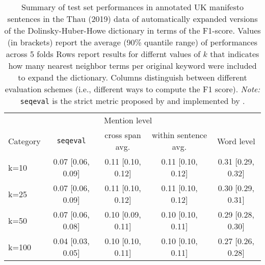 \begin{table}[!t]

\caption{\label{tab:dictionary_expansion_all_f1s_by_k}Summary of test set performances in annotated UK manifesto sentences in the  Thau (2019) data of automatically expanded versions of the Dolinsky-Huber-Howe dictionary in terms of the F1-score. Values (in brackets) report the average (90\% quantile range) of performances across 5 folds Rows report results for differnt values of $k$ that indicates how many nearest neighbor terms per original keyword were included to expand the dictionary. Columns distinguish between different evaluation schemes (i.e., different ways to compute the F1 score). \emph{Note:} \texttt{seqeval} is the strict metric proposed by \citet{ramshaw_text_1995} and implemented by \citet{nakayama_seqeval_2018}.}
\centering
\fontsize{10}{12}\selectfont
\begin{tabular}[t]{lcccc}
\toprule
\multicolumn{1}{c}{ } & \multicolumn{3}{c}{Mention level} & \multicolumn{1}{c}{ } \\
\cmidrule(l{3pt}r{3pt}){2-4}
Category & \texttt{seqeval} & cross span avg. & within sentence avg. & Word level\\
\midrule
k=10 & 0.07 [0.06, 0.09] & 0.11 [0.10, 0.12] & 0.11 [0.10, 0.12] & 0.31 [0.29, 0.32]\\
k=25 & 0.07 [0.06, 0.09] & 0.11 [0.10, 0.12] & 0.11 [0.10, 0.12] & 0.30 [0.29, 0.31]\\
k=50 & 0.07 [0.06, 0.08] & 0.10 [0.09, 0.11] & 0.10 [0.10, 0.11] & 0.29 [0.28, 0.30]\\
k=100 & 0.04 [0.03, 0.05] & 0.10 [0.10, 0.11] & 0.10 [0.10, 0.11] & 0.27 [0.26, 0.28]\\
\bottomrule
\end{tabular}
\end{table}
